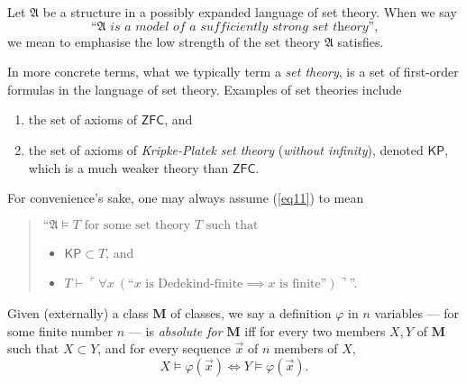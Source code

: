 \documentclass[12pt]{article}
\numberwithin{equation}{section}
\begin{document}
\begin{defi}
Let $\mathfrak{A}$ be a structure in a possibly expanded language of set theory. When we say 
\begin{equation}\label{eq11}
    \text{``}\mathfrak{A} \textit{ is a model of a sufficiently strong set theory'',} 
\end{equation}
we mean to emphasise the low strength of the set theory $\mathfrak{A}$ satisfies. 

In more concrete terms, what we typically term a \emph{set theory}, is a set of first-order formulas in the language of set theory. Examples of set theories include
\begin{enumerate}[label=(\roman*)]
    \item the set of axioms of $\mathsf{ZFC}$, and
    \item the set of axioms of \textit{Kripke-Platek set theory} (\emph{without infinity}), denoted $\mathsf{KP}$, which is a much weaker theory than $\mathsf{ZFC}$.
\end{enumerate} 
For convenience's sake, one may always assume (\ref{eq11}) to mean 
\begin{quote}
    $\text{``}\mathfrak{A} \models T \text{ for some set theory } T \text{ such that}$ 
    \begin{itemize}
        \item $\mathsf{KP} \subset T$, and
        \item $T \vdash \ulcorner \forall x \ (\text{``} x \text{ is Dedekind-finite} \implies x \text{ is finite''}) \urcorner$''.
    \end{itemize}
\end{quote}
\end{defi}

\begin{defi}
Given (externally) a class $\mathbf{M}$ of classes, we say a definition $\varphi$ in $n$ variables --- for some finite number $n$ --- is \emph{absolute for} $\mathbf{M}$ iff for every two members $X, Y$ of $\mathbf{M}$ such that $X \subset Y$, and for every sequence $\Vec{x}$ of $n$ members of $X$,
\begin{equation*}
    X \models \varphi(\Vec{x}) \iff Y \models \varphi(\Vec{x}) \text{.}
\end{equation*}
\end{defi}
\end{document}
